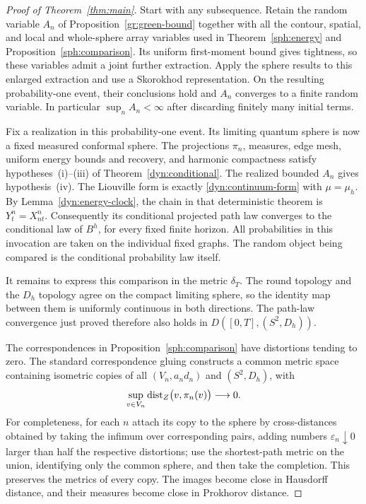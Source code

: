 \begin{proof}[Proof of Theorem~\ref{thm:main}]\label{dyn:main-proof}
Start with any subsequence.  Retain the random variable $A_n$ of
Proposition~\ref{gr:green-bound} together with all the contour,
spatial, and local and whole-sphere array variables used in
Theorem~\ref{sph:energy} and Proposition~\ref{sph:comparison}.
Its uniform first-moment bound gives tightness, so these variables
admit a joint further extraction.  Apply the sphere results to this
enlarged extraction and use a Skorokhod representation.  On the
resulting probability-one event, their conclusions hold and $A_n$
converges to a finite random variable.  In particular
$\sup_n A_n<\infty$ after discarding finitely many initial terms.

Fix a realization in this probability-one event.  Its limiting
quantum sphere is now a fixed measured conformal sphere.  The
projections $\pi_n$, measures, edge mesh, uniform energy bounds and
recovery, and harmonic compactness satisfy hypotheses~(i)--(iii)
of Theorem~\ref{dyn:conditional}.  The realized bounded $A_n$ gives
hypothesis~(iv).  The Liouville form is exactly
\eqref{dyn:continuum-form} with $\mu=\mu_h$.  By
Lemma~\ref{dyn:energy-clock}, the chain in that deterministic theorem
is $Y^n_t=X^n_{nt}$.  Consequently its conditional projected path
law converges to the conditional law of $B^h$, for every fixed
finite horizon.  All probabilities in this invocation are taken
on the individual fixed graphs.  The random object being compared
is the conditional probability law itself.

It remains to express this comparison in the metric $\delta_T$.
The round topology and the $D_h$ topology agree on the compact
limiting sphere, so the identity map between them is uniformly
continuous in both directions.  The path-law convergence just
proved therefore also holds in $D([0,T],(S^2,D_h))$.

The correspondences in Proposition~\ref{sph:comparison} have
distortions tending to zero.  The standard correspondence gluing
constructs a common metric space containing isometric copies of
all $(V_n,a_nd_n)$ and $(S^2,D_h)$, with
\[
 \sup_{v\in V_n}\operatorname{dist}_Z\bigl(v,\pi_n(v)\bigr)\longrightarrow0.
\]
For completeness, for each $n$ attach its copy to the sphere by
cross-distances obtained by taking the infimum over corresponding
pairs, adding numbers $\varepsilon_n\downarrow0$ larger than half
the respective distortions;
use the shortest-path metric on the union, identifying only the
common sphere, and then take the completion.  This preserves the
metrics of every copy.  The images become close in Hausdorff
distance, and their measures become close in Prokhorov distance.


\end{proof}
